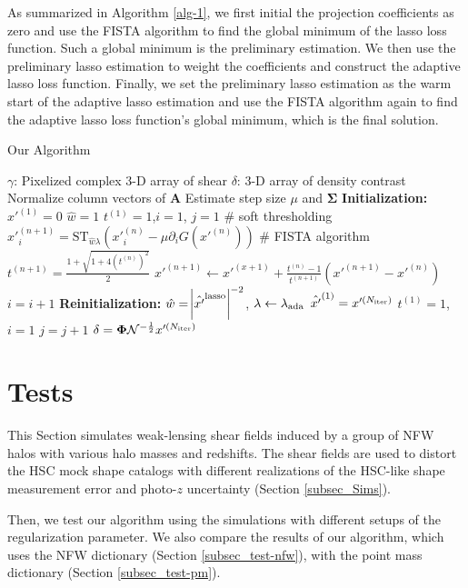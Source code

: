 \documentclass[twocolumn]{aastex63}
\begin{document}
As summarized in Algorithm \ref{alg-1}, we first initial the projection
coefficients as zero and use the FISTA algorithm to find the global minimum of
the lasso loss function. Such a global minimum is the preliminary estimation.
We then use the preliminary lasso estimation to weight the coefficients and
construct the adaptive lasso loss function. Finally, we set the preliminary
lasso estimation as the warm start of the adaptive lasso estimation and use the
FISTA algorithm again to find the adaptive lasso loss function's global minimum,
which is the final solution.


\begin{algorithm}[H]
\renewcommand{\thealgorithm}{}
\label{alg-1}
\caption{Our Algorithm}
\begin{algorithmic}[1]
\INPUT $\gamma$: Pixelized complex $3$-D array of shear
\OUTPUT  $\delta$: $3$-D array of density contrast
\STATE Normalize column vectors of $\mathbf{A}$
\STATE Estimate step size $\mu$ and $\mathbf{\Sigma}$
\STATE \textbf{Initialization:}
\STATE $x'^{(1)} = 0$
\STATE $\hat{w}=1$
\STATE $t^{(1)}=1$,$i=1$, $j=1$
        \STATE \# soft thresholding
        \STATE $x'^{(n+1)}_{i}=\mathrm{ST}_{\hat{w}\lambda} \left(x'^{(n)}_{i} -\mu \partial_i G(x'^{(n)})\right)$
        \STATE \# FISTA algorithm
        \STATE $t^{(n+1)}=\frac{1+\sqrt{1+4(t^{(n)})^2}}{2}$
        \STATE $x'^{(n+1)} \leftarrow x'^{(x+1)}+ \frac{t^{(n)}-1}{t^{(n+1)}}(x'^{(n+1)}-x'^{(n)})$
        \STATE $i=i+1$
    \ENDWHILE
\STATE \textbf{Reinitialization:}
\STATE $\hat{w}=\abs{\hat{x'}^{\rm{lasso}}}^{-2}$, $\lambda \leftarrow
\lambda_{\rm{ada}}$
\STATE $\hat{x'}^{(1)} = x'^{(N_{\rm{iter}})}$
\STATE $t^{(1)}=1$, $i=1$
\STATE $j=j+1$
\ENDWHILE
\STATE $\delta=\mathbf{\Phi}\mathcal{N}^{-\frac{1}{2}}x'^{(N_{\rm{iter}})}$
\end{algorithmic}
\end{algorithm}


\section{Tests}
\label{sec_Test}

This Section simulates weak-lensing shear fields induced by a group of NFW
halos with various halo masses and redshifts. The shear fields are used to
distort the HSC mock shape catalogs with different realizations of the HSC-like
shape measurement error and photo-$z$ uncertainty (Section \ref{subsec_Sims}).

Then, we test our algorithm using the simulations with different setups of the
regularization parameter. We also compare the results of our algorithm, which
uses the NFW dictionary (Section \ref{subsec_test-nfw}), with the point mass
dictionary (Section \ref{subsec_test-pm}).
\end{document}
